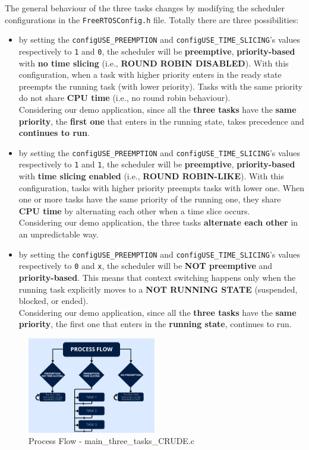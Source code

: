 The general behaviour of the three tasks changes by modifying the scheduler configurations in the \texttt{FreeRTOSConfig.h} file. Totally there are three possibilities:
\begin{itemize}
    \item by setting the \texttt{configUSE\_PREEMPTION} and \texttt{configUSE\_TIME\_SLICING}'s values respectively to \texttt{1} and \texttt{0}, the scheduler will be \textbf{preemptive}, \textbf{priority-based} with \textbf{no time slicing} (i.e., \textbf{ROUND ROBIN DISABLED}). With this configuration, when a task with higher priority enters in the ready state preempts the running task (with lower priority). Tasks with the same priority do not share \textbf{CPU time} (i.e., no round robin behaviour).  \\
    Considering our demo application, since all the \textbf{three tasks} have the \textbf{same priority}, the \textbf{first one} that enters in the running state, takes precedence and \textbf{continues to run}.
    \item by setting the \texttt{configUSE\_PREEMPTION} and \texttt{configUSE\_TIME\_SLICING}'s values respectively to \texttt{1} and \texttt{1}, the scheduler will be \textbf{preemptive}, \textbf{priority-based} with \textbf{time slicing enabled} (i.e., \textbf{ROUND ROBIN-LIKE}). With this configuration, tasks with higher priority preempts tasks with lower one. When one or more tasks have the same priority of the running one, they share \textbf{CPU time} by alternating each other when a time slice occurs. \\
    Considering our demo application, the three tasks \textbf{alternate each other} in an unpredictable way.
    \item by setting the \texttt{configUSE\_PREEMPTION} and \texttt{configUSE\_TIME\_SLICING}'s values respectively to \texttt{0} and \texttt{x}, the scheduler will be \textbf{NOT preemptive} and \textbf{priority-based}. This means that context switching happens only when the running task explicitly moves to a \textbf{NOT RUNNING STATE}
    (suspended, blocked, or ended).\\
    Considering our demo application, since all the \textbf{three tasks} have the \textbf{same priority}, the first one that enters in the \textbf{running state}, continues to run.
\end{itemize}

\begin{figure}[H]
    \centering
    \includegraphics[width=0.5\textwidth]{img/three_tasks_CRUDE.png}
    \caption{Process Flow - main\_three\_tasks\_CRUDE.c}
    \label{fig:Process Flow - CRUDE DELAY}
\end{figure}


